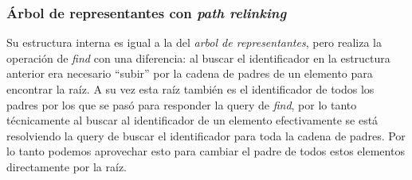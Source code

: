 \subsubsection{Árbol de representantes con \textit{path relinking}}
Su estructura interna es igual a la del \textit{arbol de representantes}, pero realiza la operaci\'on de \textit{find} con una diferencia: al buscar el identificador en la estructura anterior era necesario ``subir'' por la cadena de padres de un elemento para encontrar la raíz. A su vez esta raíz también es el identificador de todos los padres por los que se pas\'o para responder la query de \textit{find}, por lo tanto técnicamente al buscar al identificador de un elemento efectivamente se está resolviendo la query de buscar el identificador para toda la cadena de padres. Por lo tanto podemos aprovechar esto para cambiar el padre de todos estos elementos directamente por la raíz.\\

